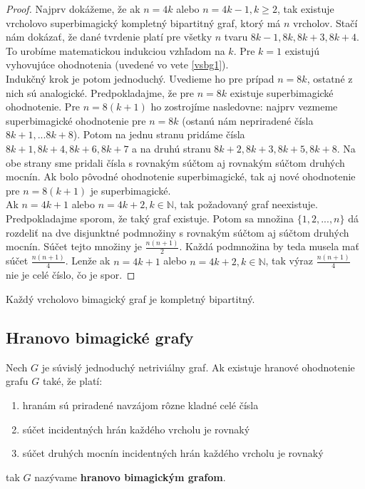 \begin{proof} Najprv dokážeme, že ak $n = 4k$ alebo $n = 4k-1, k \geq 2$, tak existuje vrcholovo superbimagický kompletný bipartitný graf, ktorý má $n$ vrcholov. Stačí nám dokázať, že dané tvrdenie platí pre všetky $n$ tvaru $8k-1, 8k, 8k+3, 8k+4$. To urobíme matematickou indukciou vzhľadom na $k$. Pre $k = 1$ existujú vyhovujúce ohodnotenia (uvedené vo vete \ref{vsbg1}). \\

Indukčný krok je potom jednoduchý. Uvedieme ho pre prípad $n = 8k$, ostatné z nich sú analogické. Predpokladajme, že pre $n = 8k$ existuje superbimagické ohodnotenie. Pre $n = 8(k+1)$ ho zostrojíme nasledovne: najprv vezmeme superbimagické ohodnotenie pre $n = 8k$ (ostanú nám nepriradené čísla $8k+1, ... 8k+8$). Potom na jednu stranu pridáme čísla $8k+1, 8k+4, 8k+6, 8k+7$ a na druhú stranu $8k+2, 8k+3, 8k+5, 8k+8$. Na obe strany sme pridali čísla s rovnakým súčtom aj rovnakým súčtom druhých mocnín. Ak bolo pôvodné ohodnotenie superbimagické, tak aj nové ohodnotenie pre $n = 8(k+1)$ je superbimagické. \\

Ak $n = 4k+1$ alebo $n = 4k+2, k \in \mathbb{N}$, tak požadovaný graf neexistuje. Predpokladajme sporom, že taký graf existuje. Potom sa množina $\{1, 2, ... , n\}$ dá rozdeliť na dve disjunktné podmnožiny s rovnakým súčtom aj súčtom druhých mocnín. Súčet tejto množiny je $\frac{n(n+1)}{2}$. Každá podmnožina by teda musela mať súčet $\frac{n(n+1)}{4}$. Lenže ak  $n = 4k+1$ alebo $n = 4k+2, k \in \mathbb{N}$, tak výraz $\frac{n(n+1)}{4}$ nie je celé číslo, čo je spor.
\end{proof}

\begin{hypothesis} Každý vrcholovo bimagický graf je kompletný bipartitný.
\end{hypothesis}



\subsection{Hranovo bimagické grafy}

\begin{definition} Nech $G$ je súvislý jednoduchý netriviálny graf. Ak existuje hranové ohodnotenie grafu $G$ také, že platí:

\begin{enumerate}
\item hranám sú priradené navzájom rôzne kladné celé čísla
\item súčet incidentných hrán každého vrcholu je rovnaký
\item súčet druhých mocnín incidentných hrán každého vrcholu je rovnaký
\end{enumerate}

tak $G$ nazývame \textbf{hranovo bimagickým grafom}.
\end{definition} 

